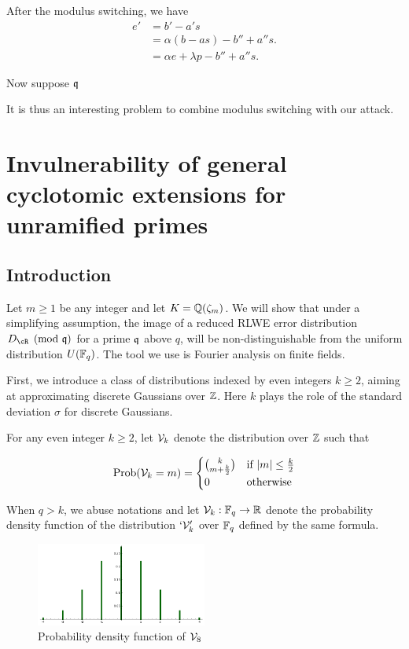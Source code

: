 \documentclass{amsart}
\begin{document}
After the modulus switching, we have
\begin{align*}
    e' &= b' - a's  \\
    &= \alpha(b-as) - b''  + a''s. \\
    & = \alpha e + \lambda p - b'' + a''s.
\end{align*}

Now suppose $\mathfrak{q}$





It is thus an interesting problem to combine modulus switching with our attack.

\section{Invulnerability of general cyclotomic extensions for unramified primes}

\subsection{Introduction}

Let $m \geq 1$ be any integer and let $K = \mathbb{Q}(\zeta_m)$. We will show that under a simplifying assumption, the image of a reduced RLWE error distribution $D_\cR \pmod{\fq}$ for a prime $\mathfrak{q}$ above $q$, will be non-distinguishable from the uniform distribution $U(\mathbb{F}_q)$. The tool we use is Fourier analysis on finite fields.

First, we introduce a class of distributions indexed by even integers $k \geq 2$, aiming at approximating discrete Gaussians over $\mathbb{Z}$. Here $k$ plays the role of
the standard deviation $\sigma$ for discrete Gaussians.
\begin{Definition}
For any even integer $k \geq 2$, let $\mathcal{V}_k$ denote the distribution over $\mathbb{Z}$ such that

$$\operatorname{Prob}(\mathcal{V}_k = m) =  \begin{cases} {k}\choose{m+\frac{k}{2}} &\mbox{if } |m| \leq \frac{k}{2} \\
0 & \mbox{otherwise}  \end{cases}$$

\end{Definition}
When $q > k$, we abuse notations and let $\mathcal{V}_k: \mathbb{F}_q \to \mathbb{R}$ denote the probability density function of the distribution $`\mathcal{V}_k'$ over $\mathbb{F}_q$ defined by the same formula.

\begin{figure}[h!]
\centering
\includegraphics[width = 0.5\textwidth]{v8.png}
\caption{Probability density function of $\mathcal{V}_8$}
\end{figure}
\end{document}
